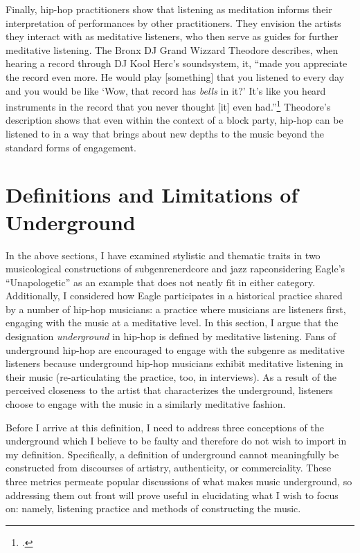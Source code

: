 Finally, hip-hop practitioners show that listening as meditation informs their interpretation of performances 
by other practitioners. They envision the artists they interact with as meditative listeners, who then serve
as guides for further meditative listening. The Bronx DJ Grand Wizzard Theodore describes, when hearing a 
record through DJ Kool Herc's soundsystem, it, ``made you appreciate the record even more. He would play 
[something] that you listened to every day and you would be like `Wow, that record has \emph{bells} in it?' 
It's like you heard instruments in the record that you never thought [it] even had.''\footnote{
    \autocite[139]{christabronGlassHiphopProduction2015}.} 
Theodore's description shows that even within the context of a block party, hip-hop can be listened to
in a way that brings about new depths to the music beyond the standard forms of engagement.

\section{Definitions and Limitations of Underground} \label{undergrounddeflims}

In the above sections, I have examined stylistic and thematic traits in two musicological 
constructions  of subgenre\textemdash nerdcore and jazz rap\textemdash considering Eagle's
``Unapologetic'' as an example that does not neatly fit in either category. Additionally, I
considered how Eagle participates in a historical practice shared by a number of hip-hop 
musicians: a practice where musicians are listeners first, engaging with the music at a meditative
level. In this section, I argue that the designation \emph{underground} in hip-hop is defined 
by meditative listening. Fans of underground hip-hop are encouraged to engage with the subgenre 
as meditative listeners because underground hip-hop musicians exhibit meditative listening in
their music (re-articulating the practice, too, in interviews). As a result of the perceived 
closeness to the artist that characterizes the underground, listeners choose to engage with
the music in a similarly meditative fashion.

Before I arrive at this definition, I need to address three conceptions of the underground 
which I believe to be faulty and therefore do not wish to import in my definition. Specifically,
a definition of underground cannot meaningfully be constructed from discourses of artistry, 
authenticity, or commerciality. These three metrics permeate popular discussions of what 
makes music underground, so addressing them out front will prove useful in elucidating what
I wish to focus on: namely, listening practice and methods of constructing the music.

